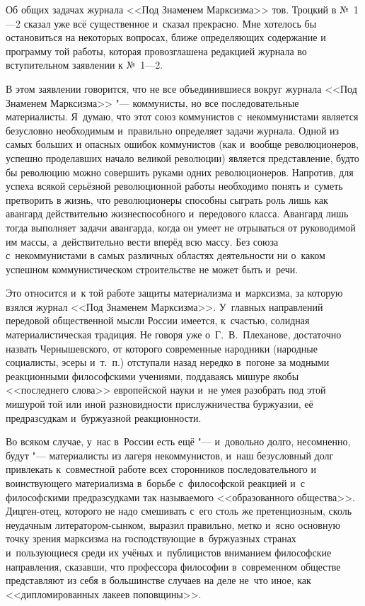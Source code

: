 Об общих задачах журнала <<Под Знаменем Марксизма>> тов. Троцкий в №~1---2
сказал уже всё существенное и~сказал прекрасно. Мне хотелось бы
остановиться на некоторых вопросах, ближе определяющих содержание и
программу той работы, которая провозглашена редакцией журнала во
вступительном заявлении к №~1---2.

В этом заявлении говорится, что не все объединившиеся вокруг журнала <<Под
Знаменем Марксизма>> "--- коммунисты, но все последовательные материалисты.
Я~думаю, что этот союз коммунистов с~некоммунистами является безусловно
необходимым и~правильно определяет задачи журнала. Одной из самых больших и
опасных ошибок коммунистов (как и~вообще революционеров, успешно
проделавших начало великой революции) является представление, будто бы
революцию можно совершить руками одних революционеров. Напротив, для успеха
всякой серьёзной революционной работы необходимо понять и~суметь претворить
в жизнь, что революционеры способны сыграть роль лишь как авангард
действительно жизнеспособного и~передового класса. Авангард лишь тогда
выполняет задачи авангарда, когда он умеет не отрываться от руководимой им
массы, а~действительно вести вперёд всю массу. Без союза с~некоммунистами в
самых различных областях деятельности ни о~каком успешном коммунистическом
строительстве не может быть и~речи.

Это относится и~к той работе защиты материализма и~марксизма, за которую
взялся журнал <<Под Знаменем Марксизма>>. У~главных направлений передовой
общественной мысли России имеется, к~счастью, солидная материалистическая
традиция. Не говоря уже о~Г.~В.~Плеханове, достаточно назвать
Чернышевского, от которого современные народники (народные социалисты,
эсеры и~т.~п.) отступали назад нередко в~погоне за модными реакционными
философскими учениями, поддаваясь мишуре якобы <<последнего слова>>
европейской науки и~не умея разобрать под этой мишурой той или иной
разновидности прислужничества буржуазии, её предразсудкам и~буржуазной
реакционности.

Во всяком случае, у~нас в~России есть ещё "--- и~довольно долго, несомненно,
будут "--- материалисты из лагеря некоммунистов, и~наш безусловный долг
привлекать к~совместной работе всех сторонников последовательного и
воинствующего материализма в~борьбе с~философской реакцией и~с философскими
предразсудками так называемого <<образованного общества>>. Дицген-отец,
которого не надо смешивать с~его столь же претенциозным, сколь неудачным
литератором-сынком, выразил правильно, метко и~ясно основную точку зрения
марксизма на господствующие в~буржуазных странах и~пользующиеся среди их
учёных и~публицистов вниманием философские направления, сказавши, что
профессора философии в~современном обществе представляют из себя в
большинстве случаев на деле не~что иное, как <<дипломированных лакеев
поповщины>>.

